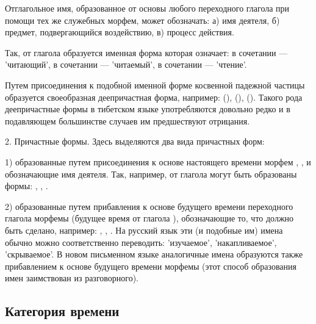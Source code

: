 Отглагольное имя, образованное от основы любого переходного глагола при помощи тех же служебных морфем, может обозначать: а) имя деятеля, б) предмет, подвергающийся воздействию, в) процесс действия.

Так, от глагола  образуется именная форма  которая означает:
в сочетании  --- 'читающий',
в сочетании  --- 'читаемый',
в сочетании  --- 'чтение'.

Путем присоединения к подобной именной форме косвенной падежной частицы  образуется своеобразная деепричастная форма, например:
 (),
 (),
 ().
Такого рода деепричастные формы в тибетском языке употребляются довольно редко и в подавляющем большинстве случаев им предшествуют отрицания.

2. Причастные формы. Здесь выделяются два вида причастных форм:

1) образованные путем присоединения к основе настоящего времени морфем , ,  и обозначающие имя деятеля. Так, например, от глагола  могут быть образованы формы:
, , .

2) образованные путем прибавления к основе будущего времени переходного глагола морфемы   (будущее время от глагола ), обозначающие то,
что должно быть сделано, например:
,
,
.
На русский язык эти (и подобные им) имена обычно можно соответственно переводить: 'изучаемое', 'накапливаемое', 'скрываемое'. В новом письменном языке аналогичные имена образуются также прибавлением к основе будущего времени морфемы  (этот способ образования имен заимствован из разговорного).

\subsection{Категория времени}

